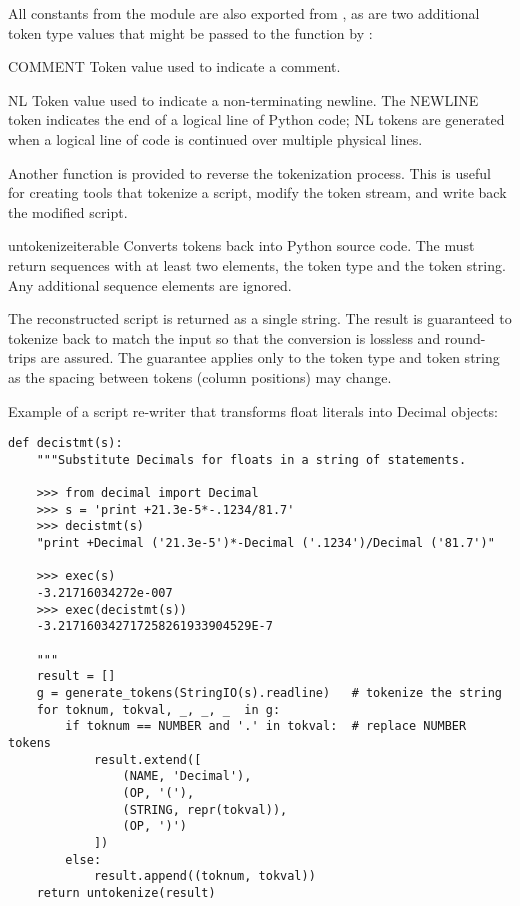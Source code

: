 All constants from the  module are also exported from
, as are two additional token type values that might be
passed to the  function by :

\begin{datadesc}{COMMENT}
  Token value used to indicate a comment.
\end{datadesc}
\begin{datadesc}{NL}
  Token value used to indicate a non-terminating newline.  The NEWLINE
  token indicates the end of a logical line of Python code; NL tokens
  are generated when a logical line of code is continued over multiple
  physical lines.
\end{datadesc}

Another function is provided to reverse the tokenization process.
This is useful for creating tools that tokenize a script, modify
the token stream, and write back the modified script.

\begin{funcdesc}{untokenize}{iterable}
  Converts tokens back into Python source code.  The 
  must return sequences with at least two elements, the token type and
  the token string.  Any additional sequence elements are ignored.

  The reconstructed script is returned as a single string.  The
  result is guaranteed to tokenize back to match the input so that
  the conversion is lossless and round-trips are assured.  The
  guarantee applies only to the token type and token string as
  the spacing between tokens (column positions) may change.
\end{funcdesc}

Example of a script re-writer that transforms float literals into
Decimal objects:
\begin{verbatim}
def decistmt(s):
    """Substitute Decimals for floats in a string of statements.

    >>> from decimal import Decimal
    >>> s = 'print +21.3e-5*-.1234/81.7'
    >>> decistmt(s)
    "print +Decimal ('21.3e-5')*-Decimal ('.1234')/Decimal ('81.7')"

    >>> exec(s)
    -3.21716034272e-007
    >>> exec(decistmt(s))
    -3.217160342717258261933904529E-7

    """
    result = []
    g = generate_tokens(StringIO(s).readline)   # tokenize the string
    for toknum, tokval, _, _, _  in g:
        if toknum == NUMBER and '.' in tokval:  # replace NUMBER tokens
            result.extend([
                (NAME, 'Decimal'),
                (OP, '('),
                (STRING, repr(tokval)),
                (OP, ')')
            ])
        else:
            result.append((toknum, tokval))
    return untokenize(result)
\end{verbatim}
